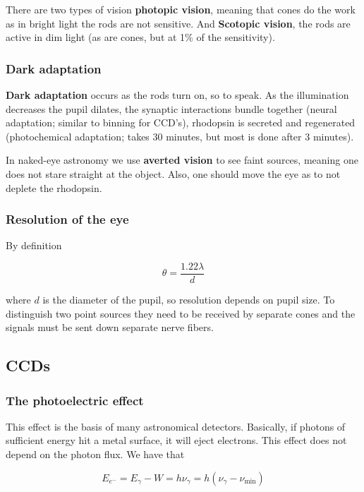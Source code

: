 \documentclass[a4paper]{article}
\begin{document}
There are two types of vision \textbf{photopic vision}, meaning that cones do the work as in bright light the rods are not sensitive. And \textbf{Scotopic vision}, the rods are active in dim light (as are cones, but at 1\% of the sensitivity).

\subsubsection*{Dark adaptation}

\textbf{Dark adaptation} occurs as the rods turn on, so to speak. As the illumination decreases the pupil dilates, the synaptic interactions bundle together (neural adaptation; similar to binning for CCD's), rhodopsin is secreted and regenerated (photochemical adaptation; takes 30 minutes, but most is done after 3 minutes). 

\bigskip

In naked-eye astronomy we use \textbf{averted vision} to see faint sources, meaning one does not stare straight at the object. Also, one should move the eye as to not deplete the rhodopsin.

\subsubsection*{Resolution of the eye}

By definition 

\begin{equation*}
    \theta = \frac{1.22\lambda}{d}
\end{equation*}

where $d$ is the diameter of the pupil, so resolution depends on pupil size. To distinguish two point sources they need to be received by separate cones and the signals must be sent down separate nerve fibers.

\subsection{CCDs}

\subsubsection*{The photoelectric effect}
This effect is the basis of many astronomical detectors. Basically, if photons of sufficient energy hit a metal surface, it will eject electrons. This effect does not depend on the photon flux. We have that

\begin{equation*}
    E_{e^{-}}=E_\gamma-W=h\nu_\gamma=h(\nu_\gamma-\nu_{\text{min}})
\end{equation*}
\end{document}
